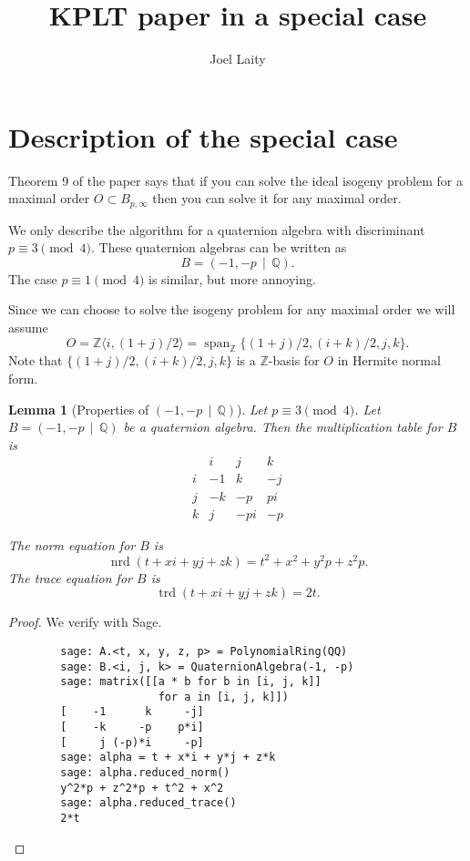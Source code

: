 \documentclass[10pt]{article}
\title{KPLT paper in a special case}
\author{Joel Laity}
\theoremstyle{plain}
\newtheorem{lemma}[theorem]{Lemma}
\theoremstyle{definition}
\newcommand{\op}{\operatorname}
\newcommand{\Z}{\mathbb{Z}}
\newcommand{\Q}{\mathbb{Q}}
\newcommand{\nrd}{\op{nrd}}
\newcommand{\trd}{\op{trd}}
\begin{document}
\maketitle
\tableofcontents


\section{Description of the special case}

Theorem 9 of the paper says that if you can solve the ideal isogeny problem for a maximal order \( O \subset B_{p, \infty} \) then you can solve it for any  maximal order.


We only describe the algorithm for a quaternion algebra with discriminant \( p \equiv 3 \pmod{4} \).
These quaternion algebras can be written as
\[
    B = (-1, -p \, \mid \, \Q).
\]
The case \( p \equiv 1 \pmod{4} \) is similar, but more annoying.

Since we can choose to solve the isogeny problem for any maximal order we will assume
\[
    O = \Z \langle i, (1+j) / 2 \rangle = \op{span}_\Z \{ (1+j) / 2, (i+k) / 2 , j, k \}.
\]
Note that \( \{ (1+j) / 2, (i+k) / 2 , j, k \} \) is a \( \Z \)-basis for \( O \) in Hermite normal form.

\begin{lemma}[Properties of \( (-1, -p \, \mid \, \Q) \)]
    Let \( p \equiv 3 \pmod{4} \).
    Let \( B =  (-1, -p \, \mid \, \Q) \) be a quaternion algebra.
    Then the multiplication table for \( B \) is
    \[
        \begin{array}{c|ccc}
              & i  & j   & k  \\
            \hline
            i & -1 & k   & -j \\
            j & -k & -p  & pi \\
            k & j  & -pi & -p
        \end{array}
    \]

    The norm equation for \( B \) is
    \[
        \nrd(t + xi + yj + zk) = t^2 + x^2 + y^2p + z^2p.
    \]
    The trace equation for \( B \) is
    \[
        \trd(t + xi + yj + zk) = 2t.
    \]
\end{lemma}
\begin{proof}
    We verify with Sage.
    \begin{lstlisting}
        sage: A.<t, x, y, z, p> = PolynomialRing(QQ)
        sage: B.<i, j, k> = QuaternionAlgebra(-1, -p)
        sage: matrix([[a * b for b in [i, j, k]]
                       for a in [i, j, k]])
        [    -1      k     -j]
        [    -k     -p    p*i]
        [     j (-p)*i     -p]
        sage: alpha = t + x*i + y*j + z*k
        sage: alpha.reduced_norm()
        y^2*p + z^2*p + t^2 + x^2
        sage: alpha.reduced_trace()
        2*t
    \end{lstlisting}
\end{proof}
\end{document}
